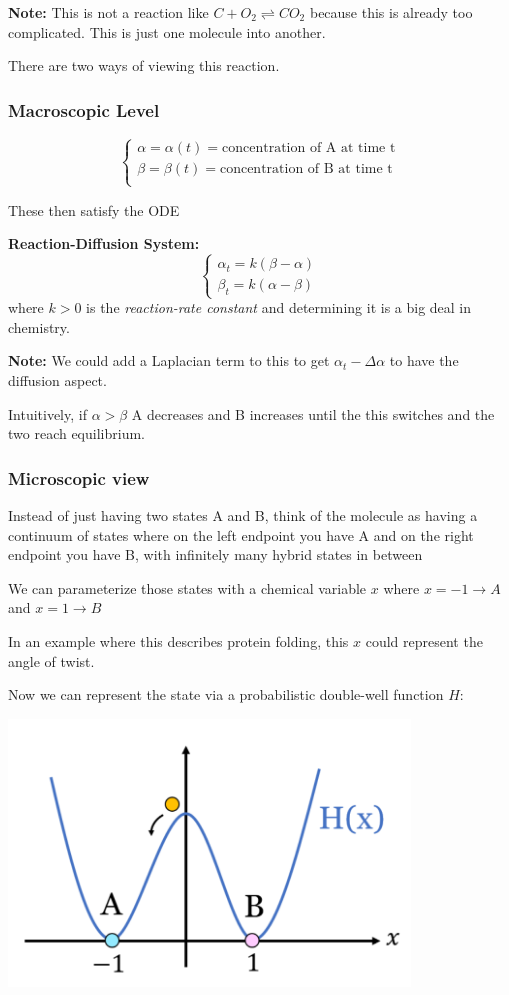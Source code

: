 \documentclass[12pt]{article}
\begin{document}
\textbf{Note:} This is not a reaction like $C + O_2 \rightleftharpoons CO_2$ because this is already too complicated. This is just one molecule into another. 

There are two ways of viewing this reaction. 

\subsubsection*{Macroscopic Level}
\[\begin{cases}
    \alpha = \alpha(t) = \text{concentration of A at time t}\\
    \beta = \beta(t) = \text{concentration of B at time t}\\
\end{cases}\]

These then satisfy the ODE 

\textbf{Reaction-Diffusion System:}
\[\boxed{\begin{cases}
    \alpha_t = k(\beta - \alpha)\\
    \beta_t = k(\alpha - \beta)
\end{cases}}\]
where $k > 0$ is the \emph{reaction-rate constant} and determining it is a big deal in chemistry. 

\textbf{Note:} We could add a Laplacian term to this to get $\alpha_t - \Delta \alpha$ to have the diffusion aspect. 

Intuitively, if $\alpha > \beta$ A decreases and B increases until the this switches and the two reach equilibrium. 

\subsubsection*{Microscopic view}
Instead of just having two states A and B, think of the molecule as having a continuum of states where on the left endpoint you have A and on the right endpoint you have B, with infinitely many hybrid states in between

We can parameterize those states with a chemical variable $x$ where $x = -1 \rightarrow A$ and $x = 1 \rightarrow B$

In an example where this describes protein folding, this $x$ could represent the angle of twist. 

Now we can represent the state via a probabilistic double-well function $H$:

\includegraphics[width=0.8\textwidth]{Images/double well.png}
\end{document}
